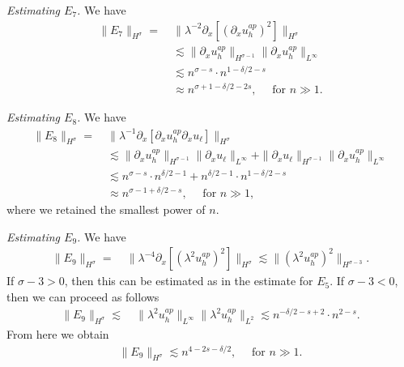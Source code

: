 \documentclass[reqno]{amsart}
\theoremstyle{plain}
\numberwithin{equation}{section}
\begin{document}
  {\em Estimating $E_7$.}
  We have 
    \begin{align*}
 \| E_7 \|_{H^\sigma}  
 = \ &  \|   \lambda^{-2}  \partial_x \left [(\partial_x u_h ^{ap}  )^2   \right ]     \|_{H^\sigma} 
 \\ & \lesssim
   \|   \partial_x   u_h^{ap}     \|_{H^{\sigma-1} }    \|    \partial_x    u_h^{ap}    \|_{ L^\infty} 
 \\ & \lesssim
 n^{ \sigma - s }  \cdot   n^{ 1-\delta/2-s} 
 \\ & 
   \approx  n^{ \sigma+1-\delta/2 - 2s } , \quad \text{ for } n \gg 1 .
 \end{align*}
 
 
  {\em Estimating $E_8$.}
  We have 
    \begin{align*}
 \| E_8 \|_{H^\sigma}  
 = \ &  \|   \lambda^{-1}  \partial_x \left [ \partial_x u_h ^{ap}   \partial_x u_\ell  \right ]     \|_{H^\sigma} 
 \\ & \lesssim
   \|   \partial_x   u_h^{ap}     \|_{H^{\sigma-1} }    \|    \partial_x    u_\ell    \|_{ L^\infty}  +    \|   \partial_x   u_\ell    \|_{H^{\sigma-1} }    \|    \partial_x    u_h^{ap}   \|_{ L^\infty}  
 \\ & \lesssim
 n^{ \sigma - s }  \cdot   n^{ \delta/2-1}  +  n^{  \delta/2-1 }  \cdot   n^{  1-\delta/2-s}
 \\ & 
   \approx  n^{ \sigma-1+\delta/2 -  s } , \quad \text{ for } n\gg 1 ,
 \end{align*}
 where we retained  the smallest power of $n$. 
 

 
   {\em Estimating $E_9$.}
  We have 
    \begin{align*}
 \| E_9 \|_{H^\sigma}  
 = \ &  \|   \lambda^{-4}  \partial_x \left [ ( \lambda^2 u_h ^{ap}  )^2   \right ]     \|_{H^\sigma} 
   \lesssim 
  \|   ( \lambda^2 u_h ^{ap}  )^2       \|_{ H^{\sigma-3} } .
   \end{align*}
   If $\sigma-3 >0$, then this can be estimated as in the estimate for $E_5$. If $\sigma-3 < 0$, then we can proceed as follows
      \begin{align*}
 \| E_9 \|_{H^\sigma}  
  \lesssim &  \ 
  \|     \lambda^2 u_h ^{ap}         \|_{ L^\infty}   \|     \lambda ^2u_h ^{ap}         \|_{ L^2} 
  \lesssim 
 n^{-\delta/2-s+2} \cdot n^{2-s}   .
 \end{align*}
 From here we obtain 
     \begin{align*}
 \| E_9 \|_{H^\sigma}  \lesssim n^{4-2s-\delta/2}  , \quad \text{ for } n\gg 1.
 \end{align*}
 
\end{document}
